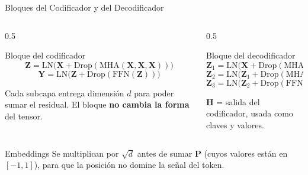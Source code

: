 \documentclass[aspectratio=169, 10pt]{beamer}
\begin{document}
\begin{frame}{Bloques del Codificador y del Decodificador}
	\begin{columns}[T]
		\begin{column}{0.5\textwidth}
			\begin{block}{Bloque del codificador}
				\small
				\[
				\mathbf{Z}=\mathrm{LN}\big(\mathbf{X}+\mathrm{Drop}(\mathrm{MHA}(\mathbf{X},\mathbf{X},\mathbf{X}))\big)
				\]
				\[
				\mathbf{Y}=\mathrm{LN}\big(\mathbf{Z}+\mathrm{Drop}(\mathrm{FFN}(\mathbf{Z}))\big)
				\]
			\end{block}
			\small
			Cada subcapa entrega dimensi\'on $d$ para poder sumar el residual. El bloque \textbf{no cambia la forma} del tensor.
		\end{column}
		\begin{column}{0.5\textwidth}
			\begin{block}{Bloque del decodificador}
				\scriptsize
				\[
				\mathbf{Z}_1=\mathrm{LN}\big(\mathbf{X}+\mathrm{Drop}(\mathrm{MHA}_{\text{enmasc.}}(\mathbf{X},\mathbf{X},\mathbf{X}))\big)
				\]
				\[
				\mathbf{Z}_2=\mathrm{LN}\big(\mathbf{Z}_1+\mathrm{Drop}(\mathrm{MHA}(\mathbf{Z}_1,\mathbf{H},\mathbf{H}))\big)
				\]
				\[
				\mathbf{Z}_3=\mathrm{LN}\big(\mathbf{Z}_2+\mathrm{Drop}(\mathrm{FFN}(\mathbf{Z}_2))\big)
				\]
			\end{block}
			\small
			$\mathbf{H}$ = salida del codificador, usada como claves y valores.
		\end{column}
	\end{columns}
	\vspace{0.2cm}
	\begin{alertblock}{Embeddings}
		\small
		Se multiplican por $\sqrt d$ antes de sumar $\mathbf{P}$ (cuyos valores est\'an en $[-1,1]$), para que la posici\'on no domine la se\~nal del token.
	\end{alertblock}
\end{frame}
\end{document}
